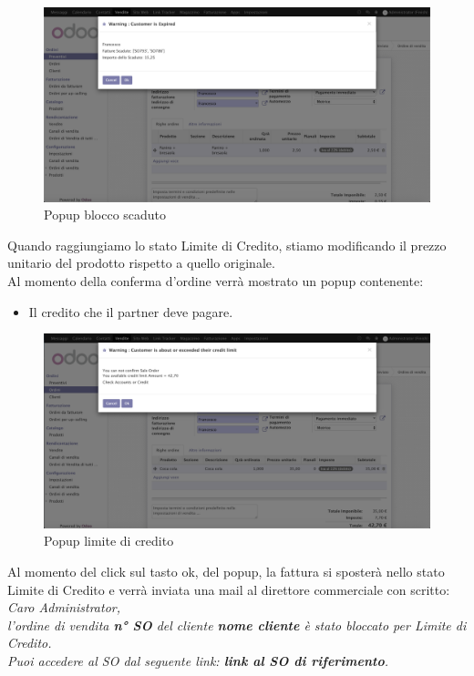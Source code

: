 \vspace*{2cm}
\begin{figure}[H]
	\begin{center} \includegraphics[scale=0.3]{figures/check_expired}
		\caption[Popup blocco scaduto]{Popup blocco scaduto}
		\label{fig:check_expired}
	\end{center}
\end{figure}
\newpage
Quando raggiungiamo lo stato Limite di Credito, stiamo modificando il prezzo unitario del prodotto rispetto a quello originale.\\
Al momento della conferma d'ordine verrà mostrato un popup contenente:
\begin{itemize}
	\item Il credito che il partner deve pagare.
\end{itemize}

\begin{figure}[H]
	\begin{center} \includegraphics[scale=0.3]{figures/check_limit}
		\caption[Popup limite di credito]{Popup limite di credito}
		\label{fig:check_limit}
	\end{center}
\end{figure}

Al momento del click sul tasto ok, del popup, la fattura si sposterà nello stato Limite di Credito e verrà inviata una mail al direttore commerciale con scritto:\vspace*{0.5cm}
\textit{Caro Administrator,\\
	l'ordine di vendita \textbf{n° SO} del cliente \textbf{nome cliente} è stato bloccato per Limite di Credito.\\
	Puoi accedere al SO dal seguente link: \textbf{link al SO di riferimento}.}

